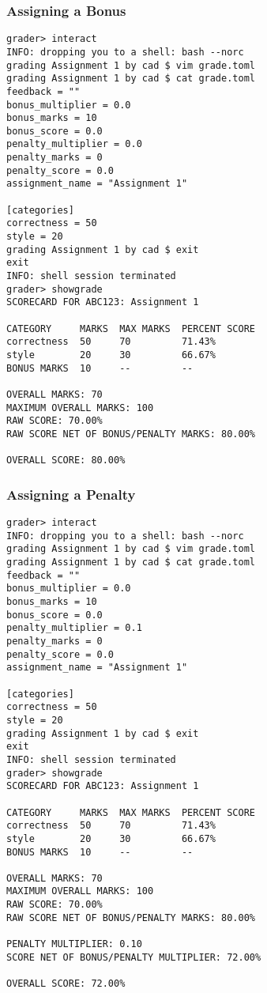 \documentclass{book}
\begin{document}
\subsubsection{Assigning a Bonus}

\begin{verbatim}
grader> interact
INFO: dropping you to a shell: bash --norc
grading Assignment 1 by cad $ vim grade.toml
grading Assignment 1 by cad $ cat grade.toml
feedback = ""
bonus_multiplier = 0.0
bonus_marks = 10
bonus_score = 0.0
penalty_multiplier = 0.0
penalty_marks = 0
penalty_score = 0.0
assignment_name = "Assignment 1"

[categories]
correctness = 50
style = 20
grading Assignment 1 by cad $ exit
exit
INFO: shell session terminated
grader> showgrade
SCORECARD FOR ABC123: Assignment 1

CATEGORY     MARKS  MAX MARKS  PERCENT SCORE
correctness  50     70         71.43%
style        20     30         66.67%
BONUS MARKS  10     --         --

OVERALL MARKS: 70
MAXIMUM OVERALL MARKS: 100
RAW SCORE: 70.00%
RAW SCORE NET OF BONUS/PENALTY MARKS: 80.00%

OVERALL SCORE: 80.00%
\end{verbatim}

\subsubsection{Assigning a Penalty}

\begin{verbatim}
grader> interact
INFO: dropping you to a shell: bash --norc
grading Assignment 1 by cad $ vim grade.toml
grading Assignment 1 by cad $ cat grade.toml
feedback = ""
bonus_multiplier = 0.0
bonus_marks = 10
bonus_score = 0.0
penalty_multiplier = 0.1
penalty_marks = 0
penalty_score = 0.0
assignment_name = "Assignment 1"

[categories]
correctness = 50
style = 20
grading Assignment 1 by cad $ exit
exit
INFO: shell session terminated
grader> showgrade
SCORECARD FOR ABC123: Assignment 1

CATEGORY     MARKS  MAX MARKS  PERCENT SCORE
correctness  50     70         71.43%
style        20     30         66.67%
BONUS MARKS  10     --         --

OVERALL MARKS: 70
MAXIMUM OVERALL MARKS: 100
RAW SCORE: 70.00%
RAW SCORE NET OF BONUS/PENALTY MARKS: 80.00%

PENALTY MULTIPLIER: 0.10
SCORE NET OF BONUS/PENALTY MULTIPLIER: 72.00%

OVERALL SCORE: 72.00%
\end{verbatim}
\end{document}
